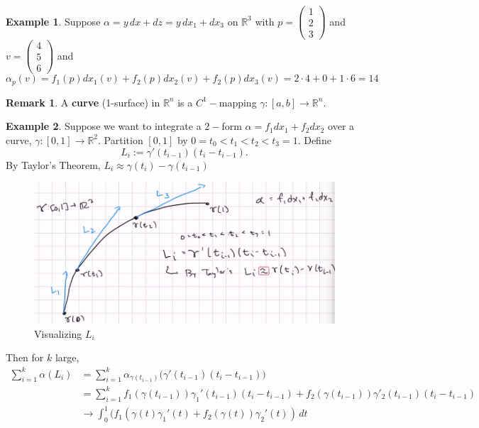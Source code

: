 \documentclass[10pt, oneside]{article}
\newcommand{\bbR}{\mathbb{R}}
\theoremstyle{definition}
\newtheorem{exmp}{Example}[section]
\newtheorem{rem}{Remark}
\begin{document}
\begin{exmp}
    Suppose $\alpha = y\,dx + dz = y\, dx_1 + dx_3$ on $\bbR^3$ with $p = \begin{pmatrix}
        1 \\ 2 \\ 3
    \end{pmatrix}$ and $v = \begin{pmatrix}
        4\\5\\6
    \end{pmatrix}$ and 
    \[\alpha_p(v) = f_1(p)dx_1(v) + f_2(p)dx_2(v) + f_2(p)dx_3(v) = 2\cdot 4 + 0 + 1 \cdot 6 = 14\]
\end{exmp}

\begin{rem}
    A \textbf{curve} (1-surface) in $\bbR^n$ is a $C^1-$mapping $\gamma: [a,b] \to \bbR^n.$ 
\end{rem}
\begin{exmp}
    Suppose we want to integrate a $2-$form $\alpha = f_1dx_1 + f_2dx_2$ over a curve, $\gamma:[0,1]\to \bbR^2.$ Partition $[0,1]$ by $0 = t_0 < t_1 < t_2 < t_3 = 1.$ Define
    \[L_i := \gamma'(t_{i-1})(t_i - t_{i-1}).\] By Taylor's Theorem, $L_i \approx \gamma(t_i) - \gamma(t_{i-1})$
    \begin{figure}[H]
        \centering
        \includegraphics[width=0.5\linewidth]{Images/1-form.png}
        \caption{Visualizing $L_i$}
    \end{figure}
    Then for $k$ large,
    \begin{align*}
    \sum_{i=1}^k \alpha(L_i) &= \sum_{i=1}^k\alpha_{\gamma(t_{i-1})}\big(\gamma'(t_{i-1})(t_i - t_{i-1})\big)\\ 
    &= \sum_{i=1}^k f_1(\gamma(t_{i-1}))\gamma_1'(t_{i-1})(t_i - t_{i-1})  + f_2(\gamma(t_{i-1}))\gamma'_2(t_{i-1})(t_i - t_{i-1}) \\
    &\to \int_0^1 (f_1(\gamma(t)\gamma_1'(t) + f_2(\gamma(t))\gamma_2'(t))\,dt
    \end{align*}
    
\end{exmp}
\end{document}
